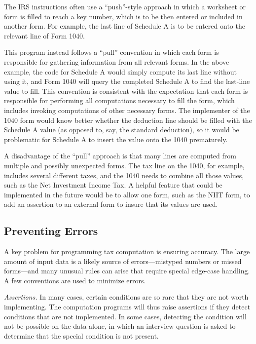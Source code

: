 The IRS instructions often use a ``push''-style approach in which a worksheet or
form is filled to reach a key number, which is to be then entered or included in
another form. For example, the last line of Schedule A is to be entered onto the
relevant line of Form 1040.

This program instead follows a ``pull'' convention in which each form is
responsible for gathering information from all relevant forms. In the above
example, the code for Schedule A would simply compute its last line without
using it, and Form 1040 will query the completed Schedule A to find the
last-line value to fill. This convention is consistent with the expectation that
each form is responsible for performing all computations necessary to fill the
form, which includes invoking computations of other necessary forms. The
implementer of the 1040 form would know better whether the deduction line should
be filled with the Schedule A value (as opposed to, say, the standard
deduction), so it would be problematic for Schedule A to insert the value onto
the 1040 prematurely.

A disadvantage of the ``pull'' approach is that many lines are computed from
multiple and possibly unexpected forms. The tax line on the 1040, for example,
includes several different taxes, and the 1040 needs to combine all those
values, such as the Net Investment Income Tax. A helpful feature that could be
implemented in the future would be to allow one form, such as the NIIT form, to
add an assertion to an external form to insure that its values are used.



\subsection{Preventing Errors}

A key problem for programming tax computation is ensuring accuracy. The large
amount of input data is a likely source of errors---mistyped numbers or missed
forms---and many unusual rules can arise that require special edge-case
handling. A few conventions are used to minimize errors.

\emph{Assertions.} In many cases, certain conditions are so rare that they are
not worth implementing. The computation programs will thus raise assertions if
they detect conditions that are not implemented. In some cases, detecting the
condition will not be possible on the data alone, in which an interview question
is asked to determine that the special condition is not present.



